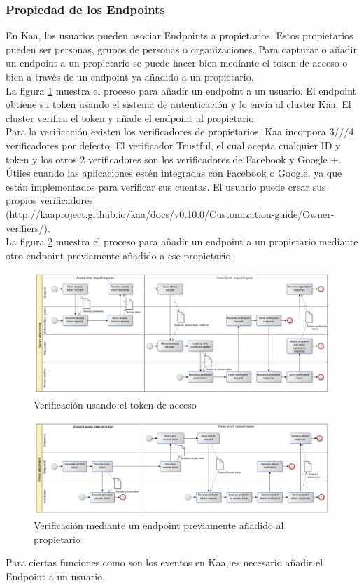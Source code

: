 \documentclass[12pt, twoside]{book}
\begin{document}
\subsubsection*{Propiedad de los Endpoints}
En Kaa, los usuarios pueden asociar Endpoints a propietarios. Estos propietarios pueden ser personas, grupos de personas o organizaciones. Para capturar o añadir un endpoint a un propietario se puede hacer bien mediante el token de acceso o bien a través de un endpoint ya añadido a un propietario.\\
La figura \ref{owner_token} muestra el proceso para añadir un endpoint a un usuario. El endpoint obtiene su token usando el sistema de autenticación y lo envía al cluster Kaa. El cluster verifica el token y añade el endpoint al propietario. \\
Para la verificación existen los verificadores de propietarios. Kaa incorpora 3///4 verificadores por defecto. El verificador Trustful, el cual acepta cualquier ID y token y los otros 2 verificadores son los verificadores de Facebook y Google +. Útiles cuando las aplicaciones estén integradas con Facebook o Google, ya que están implementados para verificar sus cuentas. El usuario puede crear sus propios verificadores (http://kaaproject.github.io/kaa/docs/v0.10.0/Customization-guide/Owner-verifiers/).\\
La figura \ref{owner_endpoint} muestra el proceso para añadir un endpoint a un propietario mediante otro endpoint previamente añadido a ese propietario. 
\begin{figure}[H]
\centering
\includegraphics[scale=0.3]{images/owner_token}
\caption{Verificación usando el token de acceso}\label{owner_token}
\end{figure}
\begin{figure}[H]
\centering
\includegraphics[scale=0.3]{images/owner_endpoint}
\caption{Verificación mediante un endpoint previamente añadido al propietario}\label{owner_endpoint}
\end{figure}
Para ciertas funciones como son los eventos en Kaa, es necesario añadir el Endpoint a un usuario. 
\end{document}
